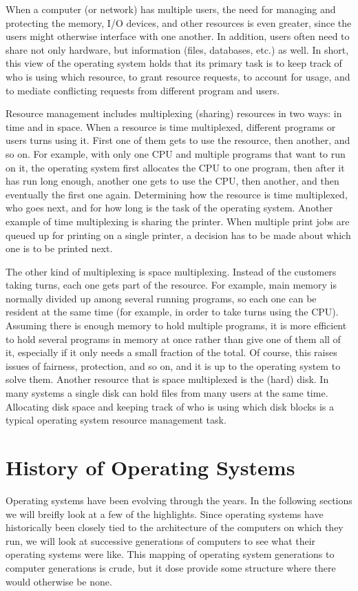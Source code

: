\documentclass{book}
\begin{document}
When a computer (or network) has multiple users, the need for managing and protecting the memory, I/O devices, and other resources is even greater, 
since the users might otherwise interface with one another.
In addition, users often need to share not only hardware, but information (files, databases, etc.) as well.
In short, this view of the operating system holds that its primary task is to keep track of who is using which resource, 
to grant resource requests, to account for usage, and to mediate conflicting requests from different program and users.

Resource management includes multiplexing (sharing) resources in two ways: in time and in space.
When a resource is time multiplexed, different programs or users turns using it.
First one of them gets to use the resource, then another, and so on.
For example, with only one CPU and multiple programs that want to run on it, the operating system first allocates the CPU to one program, 
then after it has run long enough, another one gets to use the CPU, then another, and then eventually the first one again.
Determining how the resource is time multiplexed, who goes next,  and for how long is the task of the operating system.
Another example of time multiplexing is sharing the printer.
When multiple print jobs are queued up for printing on a single printer, a decision has to be made about which one is to be printed next.

The other kind of multiplexing is space multiplexing. 
Instead of the customers taking turns, each one gets part of the resource.
For example, main memory is normally divided up among several running programs, so each one can be resident at the same time 
(for example, in order to take turns using the CPU).
Assuming there is enough memory to hold multiple programs, 
it is more efficient to hold several programs in memory at once rather than give one of them all of it, 
especially if it only needs a small fraction of the total.
Of course, this raises issues of fairness, protection, and so on, and it is up to the operating system to solve them.
Another resource that is space multiplexed is the (hard) disk.
In many systems a single disk can hold files from many users at the same time.
Allocating disk space and keeping track of who is using which disk blocks is a typical operating system resource management task.

\section{History of Operating Systems}
Operating systems have been evolving through the years.
In the following sections we will breifly look at a few of the highlights.
Since operating systems have historically been closely tied to the architecture of the computers on which they run, 
we will look at successive generations of computers to see what their operating systems were like.
This mapping of operating system generations to computer generations is crude, but it dose provide some structure where there would otherwise be none.
\end{document}
